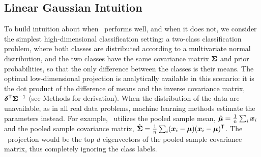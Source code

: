 \documentclass[10pt]{article}
\begin{document}

\subsection*{Linear Gaussian Intuition}

To build intuition about when \Lol~performs well, and when it does not,
we consider the simplest high-dimensional classification setting: a two-class classification problem, where both classes are distributed according to a multivariate normal distribution, and the two classes have the same covariance matrix $\boldsymbol{\Sigma}$ and prior probabilities, so that the only difference between the classes is their means.
%
The optimal low-dimensional projection is analytically available in this scenario: it is the dot product of the difference of means and the inverse covariance matrix, $\boldsymbol{\delta}^{\mathsf{T}} \boldsymbol{\Sigma}^{-1}$ \cite{Bickel2004a} (see Methods for derivation).
When the distribution of the data are unavailable, as in all real data problems, machine learning methods estimate the parameters instead.  For example, \Pca~utilizes the pooled sample mean, $\hat{\boldsymbol{\mu}}= \frac{1}{n} \sum_i \boldsymbol{x}_i$ and the pooled sample covariance matrix,  $\hat{\boldsymbol{\Sigma}}=\frac{1}{n} \sum_i (\boldsymbol{x}_i - \boldsymbol{\mu}) (\boldsymbol{x}_i - \boldsymbol{\mu})^{\mathsf{T}}$.  
The \Pca~projection would be the top $d$ eigenvectors of the pooled sample covariance matrix, thus completely ignoring the class labels.
\end{document}
